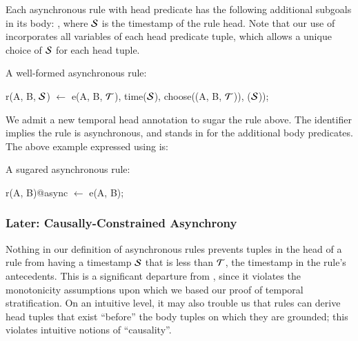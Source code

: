 \noindent
Each asynchronous rule with head predicate  has the following additional subgoals in its
body: , where
$\SDedalus$ is the timestamp of the rule head.  Note that our use of  incorporates all variables of each head predicate tuple, which allows a unique choice of $\SDedalus$ for each head tuple.


\begin{example}
A well-formed asynchronous \lang rule:

\begin{Dedalus}
r(A, B, \(\SDedalus\)) \(\leftarrow\) 
  e(A, B, \(\Tau\)),
  time(\(\SDedalus\)), choose((A, B, \(\Tau\))), (\(\SDedalus\)));
\end{Dedalus}
\end{example}

We admit a new temporal head annotation to sugar the rule above.  The
identifier  implies the rule is asynchronous, and stands in for
the additional body predicates.
The above example expressed using  is:

\begin{example}
	A sugared asynchronous \lang rule:
	
\begin{Dedalus}
r(A, B)@async \(\leftarrow\) e(A, B);
\end{Dedalus}
\end{example}


\subsubsection{Later: Causally-Constrained Asynchrony}

Nothing in our definition of asynchronous rules prevents tuples in the head of a rule from having a timestamp $\SDedalus$ that is less than $\Tau$, the timestamp
in the rule's antecedents. This is a significant departure from \slang, since it
violates the monotonicity assumptions upon which we based our proof of temporal stratification.
On an intuitive level, it may also trouble us that rules can derive head tuples that exist ``before'' the body tuples on which they are grounded; this violates intuitive notions of ``causality''.


